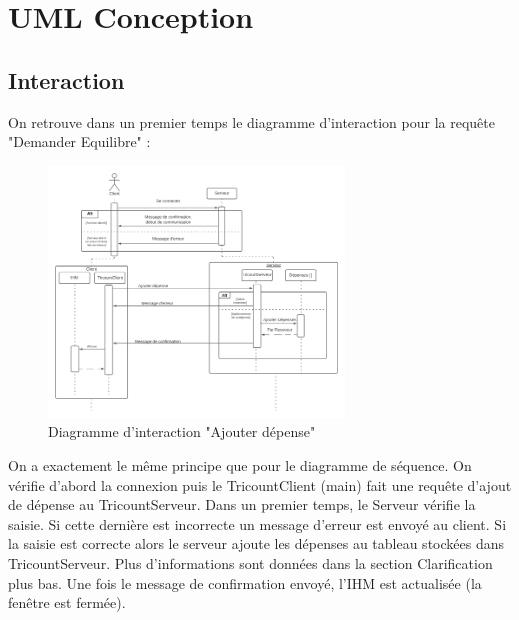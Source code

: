 \documentclass[12,french]{report}
\begin{document}
\chapter{UML Conception}

\section{Interaction}

On retrouve dans un premier temps le diagramme d'interaction pour la requête "Demander Equilibre" :

\begin{figure}[H]
	\center
	\includegraphics[width=0.7\textwidth]{./Images/Interaction_AjouterDepense}
	\caption{Diagramme d'interaction "Ajouter dépense"}
\end{figure}\vspace{0.2cm}

On a exactement le même principe que pour le diagramme de séquence. On vérifie d’abord la connexion puis le TricountClient (main) fait une requête d’ajout de dépense au TricountServeur. Dans un premier temps, le Serveur vérifie la saisie. Si cette dernière est incorrecte un message d'erreur est envoyé au client. Si la saisie est correcte alors le serveur ajoute les dépenses au tableau stockées dans TricountServeur. Plus d'informations sont données dans la section Clarification plus bas.
Une fois le message de confirmation envoyé, l'IHM est actualisée (la fenêtre est fermée). \\
\end{document}
